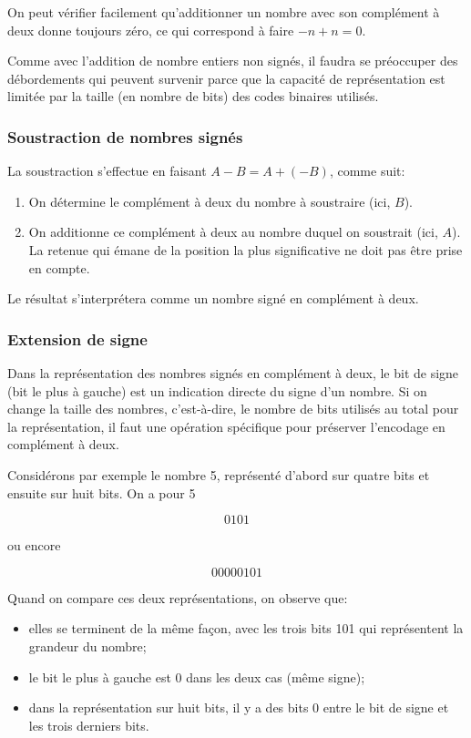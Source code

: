 \documentclass[11pt]{article}
\begin{document}
On peut vérifier facilement qu'additionner un nombre avec son
complément à deux donne toujours zéro, ce qui correspond à faire \(-n + n
= 0\).

Comme avec l'addition de nombre entiers non signés, il faudra se
préoccuper des débordements qui peuvent survenir parce que la capacité
de représentation est limitée par la taille (en nombre de bits) des
codes binaires utilisés.

\subsubsection{Soustraction de nombres signés}
\label{sec:orga72b287}

La soustraction s'effectue en faisant \(A - B = A + (-B)\), comme suit:

\begin{enumerate}
\item On détermine le complément à deux du nombre à soustraire (ici, \(B\)).
\item On additionne ce complément à deux au nombre duquel on soustrait  (ici, \(A\)). La
retenue qui émane de la position la plus significative ne doit pas
être prise en compte.
\end{enumerate}

Le résultat s'interprétera comme un nombre signé en complément à deux. 

\subsubsection{Extension de signe}
\label{sec:org61b7f22}

Dans la représentation des nombres signés en complément à deux, le bit
de signe (bit le plus à gauche) est un indication directe du signe
d'un nombre. Si on change la taille des nombres, c'est-à-dire, le nombre
de bits utilisés au total pour la représentation, il faut une
opération spécifique pour préserver l'encodage en complément à deux. 

Considérons par exemple le nombre 5, représenté d'abord sur quatre
bits et ensuite sur huit bits. On a pour 5 

$$ 0101 $$

ou encore 

$$ 00000101 $$

Quand on compare ces deux représentations, on observe que: 

\begin{itemize}
\item elles se terminent de la même façon, avec les trois bits 101 qui
représentent la grandeur du nombre;
\item le bit le plus à gauche est 0 dans les deux cas (même signe);
\item dans la représentation sur huit bits, il y a des bits 0 entre le bit
de signe et les trois derniers bits.
\end{itemize}
\end{document}
